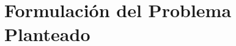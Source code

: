 \documentclass[usenames,dvipsnames]{beamer}
\begin{document}
\begin{frame}



\end{frame}


\section{Formulación del Problema Planteado}
\end{document}
